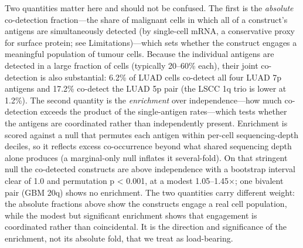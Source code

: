 \documentclass[times, twoside]{zHenriquesLab-StyleBioRxiv}
\begin{document}
Two quantities matter here and should not be confused. The first is the \emph{absolute} co-detection fraction---the share of malignant cells in which all of a construct's antigens are simultaneously detected (by single-cell mRNA, a conservative proxy for surface protein; see Limitations)---which sets whether the construct engages a meaningful population of tumour cells. Because the individual antigens are detected in a large fraction of cells (typically 20--60\% each), their joint co-detection is also substantial: 6.2\% of LUAD cells co-detect all four LUAD 7p antigens and 17.2\% co-detect the LUAD 5p pair (the LSCC 1q trio is lower at 1.2\%). The second quantity is the \emph{enrichment} over independence---how much co-detection exceeds the product of the single-antigen rates---which tests whether the antigens are coordinated rather than independently present. Enrichment is scored against a null that permutes each antigen within per-cell sequencing-depth deciles, so it reflects excess co-occurrence beyond what shared sequencing depth alone produces (a marginal-only null inflates it several-fold). On that stringent null the co-detected constructs are above independence with a bootstrap interval clear of 1.0 and permutation p < 0.001, at a modest 1.05--1.45$\times$; one bivalent pair (GBM 20q) shows no enrichment. The two quantities carry different weight: the absolute fractions above show the constructs engage a real cell population, while the modest but significant enrichment shows that engagement is coordinated rather than coincidental. It is the direction and significance of the enrichment, not its absolute fold, that we treat as load-bearing.
\end{document}
